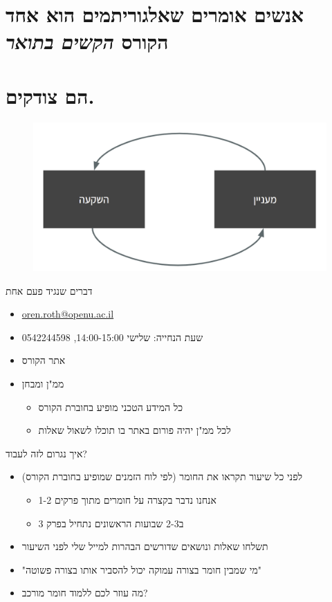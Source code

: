\documentclass[luatex]{beamer}
\begin{document}
 \section{אנשים אומרים שאלגוריתמים הוא אחד הקורס 
 \textit{הקשים בתואר}
}
  \section{הם צודקים.}
  \begin{frame}
  \begin{figure}
  	\centering
  	\includegraphics[width=1\linewidth]{imgs/hard}
  	\label{fig:hard}
  \end{figure}
  \end{frame}
\begin{frame}{דברים שנגיד פעם אחת}
\pause
\begin{itemize}[<+->]
	\item \url{oren.roth@openu.ac.il}
	\item שעת הנחייה: שלישי 14:00-15:00, 0542244598
	\item אתר הקורס
	\item   ממ"ן ומבחן
	\begin{itemize}[<+->]
		\item כל המידע הטכני מופיע בחוברת הקורס
		\item לכל ממ"ן יהיה פורום באתר בו תוכלו לשאול שאלות
	\end{itemize}
\end{itemize}
\end{frame}
\begin{frame}{איך נגרום לזה לעבוד?}
\pause
\begin{itemize}[<+->]
\item לפני כל שיעור תקראו את החומר (לפי לוח הזמנים שמופיע בחוברת הקורס)
	\begin{itemize}[<+->]
	\item  אנחנו נדבר בקצרה על חומרים מתוך פרקים  1-2
	\item ב2-3 שבועות הראשונים נתחיל בפרק 3
\end{itemize}
\item תשלחו שאלות ונושאים שדורשים הבהרות למייל שלי לפני השיעור
\item "מי שמבין חומר בצורה עמוקה יכול להסביר אותו בצורה פשוטה"
\item מה עוזר לכם ללמוד חומר מורכב?
\end{itemize}
\end{frame}
\end{document}
